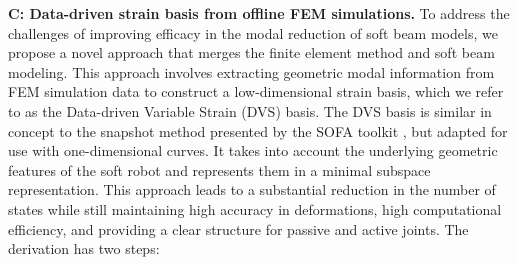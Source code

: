 \label{sec:C5:femPODbasis}
\textbf{C: Data-driven strain basis from offline FEM simulations.} To address the challenges of improving efficacy in the modal reduction of soft beam models, we propose a novel approach that merges the finite element method and soft beam modeling. This approach involves extracting geometric modal information from FEM simulation data to construct a low-dimensional strain basis, which we refer to as the Data-driven Variable Strain (DVS) basis. The DVS basis is similar in concept to the snapshot method presented by the SOFA toolkit \cite{Duriez2016,Coevoet2017,Goury2018}, but adapted for use with one-dimensional curves. It takes into account the underlying geometric features of the soft robot and represents them in a minimal subspace representation. This approach leads to a substantial reduction in the number of states while still maintaining high accuracy in deformations, high computational efficiency, and providing a clear structure for passive and active joints. The derivation has two steps: \\

